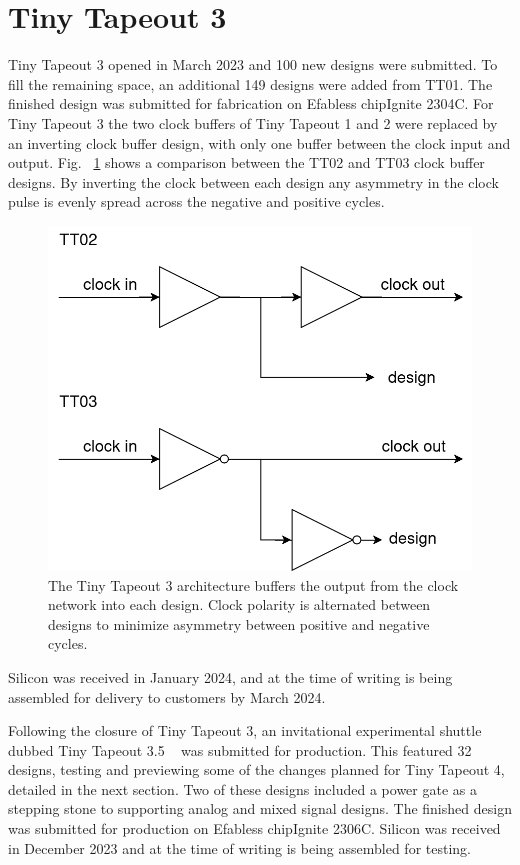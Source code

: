 \section{Tiny Tapeout 3}
\label{sec:tinytapeout3}

Tiny Tapeout 3 opened in March 2023 and 100 new designs were submitted. To fill the remaining space, an additional 149 designs were added from TT01. 
The finished design was submitted for fabrication on Efabless chipIgnite 2304C.
For Tiny Tapeout 3 the two clock buffers of Tiny Tapeout 1 and 2 were replaced by an inverting clock buffer design, with only one buffer between the clock input and output. Fig. ~\ref{fig:TT02_vs_TT03} shows a comparison between the TT02 and TT03 clock buffer designs. By inverting the clock between each design any asymmetry in the clock pulse is evenly spread across the negative and positive cycles.

\begin{figure}[!t]
\centering
\includegraphics[width=\columnwidth]{./Figs/tt02 vs tt03 scanchain clock.png}
\caption{The Tiny Tapeout 3 architecture buffers the output from the clock network into each design. Clock polarity is alternated between designs to minimize asymmetry between positive and negative cycles.}
\label{fig:TT02_vs_TT03}
\end{figure}

Silicon was received in January 2024, and at the time of writing is being assembled for delivery to customers by March 2024.

Following the closure of Tiny Tapeout 3, an invitational experimental shuttle dubbed Tiny Tapeout 3.5 ~\cite{tinytapeout03p5} was submitted for production. This featured 32 designs, testing and previewing some of the changes planned for Tiny Tapeout 4, detailed in the next section.  Two of these designs included a power gate as a stepping stone to supporting analog and mixed signal designs. 
The finished design was submitted for production on Efabless chipIgnite 2306C.
Silicon was received in December 2023 and at the time of writing is being assembled for testing.


